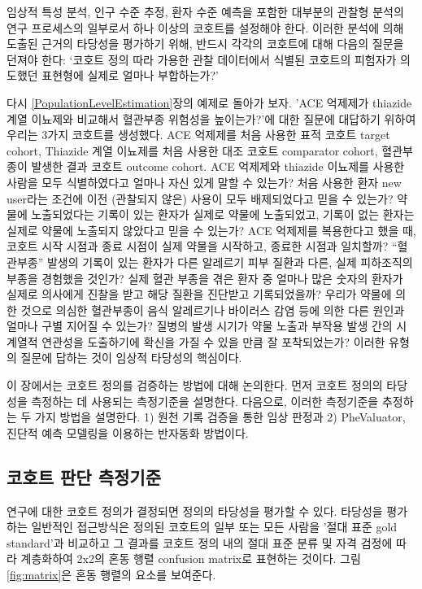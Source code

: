 \documentclass[10.5pt]{book}
\theoremstyle{definition}
\theoremstyle{definition}
\theoremstyle{definition}
\theoremstyle{remark}
\begin{document}
임상적 특성 분석, 인구 수준 추정, 환자 수준 예측을 포함한 대부분의
관찰형 분석의 연구 프로세스의 일부로서 하나 이상의 코호트를 설정해야
한다. 이러한 분석에 의해 도출된 근거의 타당성을 평가하기 위해, 반드시
각각의 코호트에 대해 다음의 질문을 던져야 한다: `코호트 정의 따라 가용한
관찰 데이터에서 식별된 코호트의 피험자가 의도했던 표현형에 실제로 얼마나
부합하는가?'

다시 \ref{PopulationLevelEstimation}장의 예제로 돌아가 보자. 'ACE
억제제가 thiazide 계열 이뇨제와 비교해서 혈관부종 위험성을 높이는가?'에
대한 질문에 대답하기 위하여 우리는 3가지 코호트를 생성했다. ACE 억제제를
처음 사용한 표적 코호트 target cohort, Thiazide 계열 이뇨제를 처음
사용한 대조 코호트 comparator cohort, 혈관부종이 발생한 결과 코호트
outcome cohort. ACE 억제제와 thiazide 이뇨제를 사용한 사람을 모두
식별하였다고 얼마나 자신 있게 말할 수 있는가? 처음 사용한 환자 new
user라는 조건에 이전 (관찰되지 않은) 사용이 모두 배제되었다고 믿을 수
있는가? 약물에 노출되었다는 기록이 있는 환자가 실제로 약물에 노출되었고,
기록이 없는 환자는 실제로 약물에 노출되지 않았다고 믿을 수 있는가? ACE
억제제를 복용한다고 했을 때, 코호트 시작 시점과 종료 시점이 실제 약물을
시작하고, 종료한 시점과 일치할까? ``혈관부종'' 발생의 기록이 있는 환자가
다른 알레르기 피부 질환과 다른, 실제 피하조직의 부종을 경험했을 것인가?
실제 혈관 부종을 겪은 환자 중 얼마나 많은 숫자의 환자가 실제로 의사에게
진찰을 받고 해당 질환을 진단받고 기록되었을까? 우리가 약물에 의한 것으로
의심한 혈관부종이 음식 알레르기나 바이러스 감염 등에 의한 다른 원인과
얼마나 구별 지어질 수 있는가? 질병의 발생 시기가 약물 노출과 부작용 발생
간의 시계열적 연관성을 도출하기에 확신을 가질 수 있을 만큼 잘
포착되었는가? 이러한 유형의 질문에 답하는 것이 임상적 타당성의 핵심이다.

이 장에서는 코호트 정의를 검증하는 방법에 대해 논의한다. 먼저 코호트
정의의 타당성을 측정하는 데 사용되는 측정기준을 설명한다. 다음으로,
이러한 측정기준을 추정하는 두 가지 방법을 설명한다. 1) 원천 기록 검증을
통한 임상 판정과 2) PheValuator, 진단적 예측 모델링을 이용하는 반자동화
방법이다.

\subsection{코호트 판단 측정기준}\label{--}

연구에 대한 코호트 정의가 결정되면 정의의 타당성을 평가할 수 있다.
타당성을 평가하는 일반적인 접근방식은 정의된 코호트의 일부 또는 모든
사람을 '절대 표준 gold standard'과 비교하고 그 결과를 코호트 정의 내의
절대 표준 분류 및 자격 검정에 따라 계층화하여 2x2의 혼동 행렬 confusion
matrix로 표현하는 것이다. 그림 \ref{fig:matrix}은 혼동 행렬의 요소를
보여준다.
\end{document}
